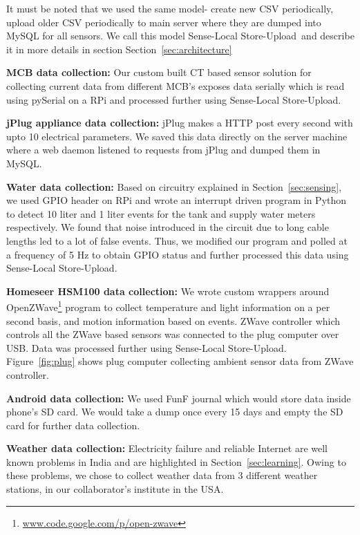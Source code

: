 \documentclass[10pt]{sensys-proc}
\newcommand{\figref}[1]{Figure~\ref{#1}}
\newcommand{\secref}[1]{Section~\ref{#1}}
\newcommand{\paradigm}{Sense-Local Store-Upload}
\newcommand{\paradigms}{Sense-Local Store-Upload~}
\begin{document}
It must be noted that we used the same model- create new CSV periodically, upload older CSV periodically to main server where they are dumped into MySQL for all sensors. We call this model \paradigms and describe it in more details in section \secref{sec:architecture}

\noindent \textbf{MCB data collection:} Our custom built CT based sensor solution for collecting current data from different MCB's exposes data serially which is read using pySerial on a RPi and processed further using \paradigm.

\noindent \textbf{jPlug appliance data collection:} jPlug makes a HTTP post every second with upto 10 electrical parameters. We saved this data directly on the server machine where a web daemon listened to requests from jPlug and dumped them in MySQL.

\noindent \textbf{Water data collection:} Based on circuitry explained in \secref{sec:sensing}, we used GPIO header on RPi and wrote an interrupt driven program in Python to detect 10 liter and 1 liter events for the tank and supply water meters respectively. We found that noise introduced in the circuit due to long cable lengths led to a lot of false events. Thus, we modified our program and polled at a frequency of 5 Hz to obtain GPIO status and further processed this data using \paradigm.	

\noindent \textbf{Homeseer HSM100 data collection:} We wrote custom wrappers around OpenZWave\footnote{\url{www.code.google.com/p/open-zwave}} program to collect temperature and light information on a per second basis, and motion information based on events. ZWave controller which controls all the ZWave based sensors was connected to the plug computer over USB. Data was processed further using \paradigm. \figref{fig:plug} shows plug computer collecting ambient sensor data from ZWave controller.

\noindent \textbf{Android data collection:} We used FunF journal which would store data inside phone's SD card. We would take a dump once every 15 days and empty the SD card for further data collection.

\noindent \textbf{Weather data collection:} Electricity failure  and reliable Internet are well known problems in India and are highlighted in \secref{sec:learning}. Owing to these problems, we chose to collect weather data from 3 different weather stations, in our collaborator's institute in the USA.
\end{document}

